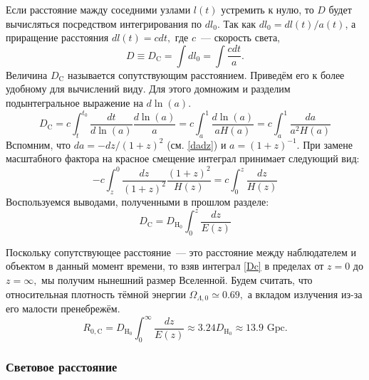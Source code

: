 Если расстояние мажду соседними узлами $l(t)$ устремить к нулю, то $D$ будет вычисляться посредством интегрирования по $dl_0.$ Так как $dl_0 = dl(t) / a(t)$, а приращение расстояния $dl(t) = c dt,$ где $c$~--- скорость света,
\begin{equation}
D \equiv D_{\text{C}} = \int dl_0 = \int \frac{c dt}{a}.
\label{com}
\end{equation}
Величина $D_{\text{C}}$ называется сопутствующим расстоянием. Приведём его к более удобному для вычислений виду. Для этого домножим и разделим подынтегральное выражение на $d \ln(a)$.
$$
D_{\text{C}} = c \int_{t}^{t_0} \frac{dt}{d \ln(a)} \frac{d \ln(a)}{a} = c \int_{a}^{1} \frac{d \ln(a)}{a H(a)} = c \int_{a}^{1} \frac{da}{a^2 H(a)}
$$
Вспомним, что $da = - dz / (1+z)^{2}$ (см. \eqref{dadz}) и $a = (1+z)^{-1}$. При замене масштабного фактора на красное смещение интеграл принимает следующий вид:
$$
-c \int_{z}^{0} \frac{dz}{(1+z)^{2}} \frac{(1+z)^{2}}{H(z)} = c \int_{0}^{z} \frac{dz}{H(z)}
$$
Воспользуемся выводами, полученными в прошлом разделе:
\begin{equation}
D_{\text{C}} = D_{\text{H}_0} \int_{0}^{z} \frac{dz}{E(z)}
\label{Dc}
\end{equation}

Поскольку сопутствующее расстояние~--- это расстояние между наблюдателем и объектом в данный момент времени, то взяв интеграл \eqref{Dc} в пределах  от $z = 0$ до $z = \infty,$ мы получим нынешний размер Вселенной. Будем считать, что относительная плотность тёмной энергии $\Omega_{\Lambda,0} \simeq 0.69,$ а вкладом излучения из-за его малости пренебрежём.
\begin{equation}
R_{0,\text{C}} = D_{\text{H}_0} \int_{0}^{\infty} \frac{dz}{E(z)} \approx 3.24D_{\text{H}_0} \approx 13.9 \text{ Gpc}.
\end{equation}

\subsubsection{Световое расстояние}


